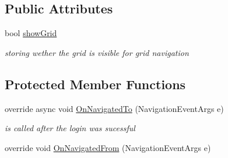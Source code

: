 \subsection*{Public Attributes}
\begin{DoxyCompactItemize}
\item 
bool \mbox{\hyperlink{class_listen_to_me_1_1_main_page_a03679610fded2c61480540ebcc7e4667}{show\+Grid}}
\begin{DoxyCompactList}\small\item\em storing wether the grid is visible for grid navigation \end{DoxyCompactList}\end{DoxyCompactItemize}
\subsection*{Protected Member Functions}
\begin{DoxyCompactItemize}
\item 
override async void \mbox{\hyperlink{class_listen_to_me_1_1_main_page_a8027d1a18b781cfe127ca02916c4552e}{On\+Navigated\+To}} (Navigation\+Event\+Args e)
\begin{DoxyCompactList}\small\item\em is called after the login was sucessful \end{DoxyCompactList}\item 
override void \mbox{\hyperlink{class_listen_to_me_1_1_main_page_a15a008ef01c6354ef72d4ec864d8d8e3}{On\+Navigated\+From}} (Navigation\+Event\+Args e)
\end{DoxyCompactItemize}
